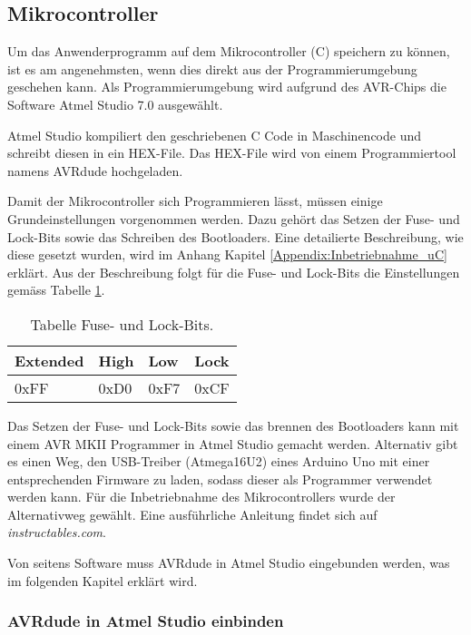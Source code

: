 \newpage
\subsection{Mikrocontroller}
\label{subsec:Inbetriebnahme_Mikrocontroller}

Um das Anwenderprogramm auf dem Mikrocontroller (\textmu C) speichern zu können, ist es am angenehmsten, wenn dies direkt aus der Programmierumgebung geschehen kann. Als Programmierumgebung wird aufgrund des AVR-Chips die Software Atmel Studio 7.0 ausgewählt.

Atmel Studio kompiliert den geschriebenen C Code in Maschinencode und schreibt diesen in ein HEX-File. Das HEX-File wird von einem Programmiertool namens AVRdude hochgeladen.\cite{verschiedene_autoren_avrdude_2019}


Damit der Mikrocontroller sich Programmieren lässt, müssen einige Grundeinstellungen vorgenommen werden. Dazu gehört das Setzen der Fuse- und Lock-Bits sowie das Schreiben des Bootloaders. Eine detailierte Beschreibung, wie diese gesetzt wurden, wird im Anhang Kapitel \ref{Appendix:Inbetriebnahme_uC} erklärt. Aus der Beschreibung folgt für die Fuse- und Lock-Bits die Einstellungen gemäss Tabelle \ref{tab:Fuse_und_Lock-Bits}.

\begin{table}[h!]
\center
\begin{tabular}{|l|l|l|l|}
\hline
\textbf{Extended} & \textbf{High} & \textbf{Low} & \textbf{Lock}\\
\hline
0xFF & 0xD0 & 0xF7 & 0xCF\\
\hline
\end{tabular}
\caption{Tabelle Fuse- und Lock-Bits.}
\label{tab:Fuse_und_Lock-Bits}
\end{table}

Das Setzen der Fuse- und Lock-Bits sowie das brennen des Bootloaders kann mit einem AVR MKII Programmer in Atmel Studio gemacht werden. Alternativ gibt es einen Weg, den USB-Treiber (Atmega16U2) eines Arduino Uno mit einer entsprechenden Firmware zu laden, sodass dieser als Programmer verwendet werden kann. Für die Inbetriebnahme des Mikrocontrollers wurde der Alternativweg gewählt. Eine ausführliche Anleitung findet sich auf \textit{instructables.com}. \cite{vidmofollow_turn_2017}

Von seitens Software muss AVRdude in Atmel Studio eingebunden werden, was im folgenden Kapitel erklärt wird.

\subsubsection{AVRdude in Atmel Studio einbinden}\label{subsubsec:avrdude_in_atmelstudio_einbinden}

